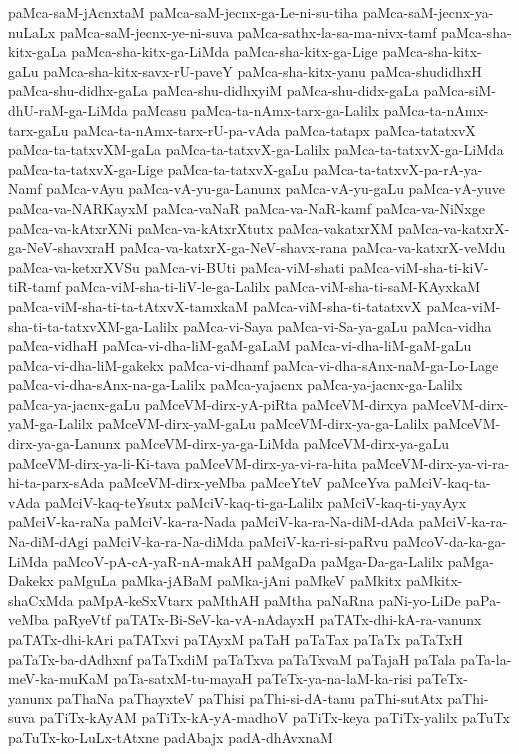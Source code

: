 {paMca-saM-jAcnxtaM
paMca-saM-jecnx-ga-Le-ni-su-tiha
paMca-saM-jecnx-ya-nuLaLx
paMca-saM-jecnx-ye-ni-suva
paMca-sathx-la-sa-ma-nivx-tamf
paMca-sha-kitx-gaLa
paMca-sha-kitx-ga-LiMda
paMca-sha-kitx-ga-Lige
paMca-sha-kitx-gaLu
paMca-sha-kitx-savx-rU-paveY
paMca-sha-kitx-yanu
paMca-shudidhxH
paMca-shu-didhx-gaLa
paMca-shu-didhxyiM
paMca-shu-didx-gaLa
paMca-siM-dhU-raM-ga-LiMda
paMcasu
paMca-ta-nAmx-tarx-ga-Lalilx
paMca-ta-nAmx-tarx-gaLu
paMca-ta-nAmx-tarx-rU-pa-vAda
paMca-tatapx
paMca-tatatxvX
paMca-ta-tatxvXM-gaLa
paMca-ta-tatxvX-ga-Lalilx
paMca-ta-tatxvX-ga-LiMda
paMca-ta-tatxvX-ga-Lige
paMca-ta-tatxvX-gaLu
paMca-ta-tatxvX-pa-rA-ya-Namf
paMca-vAyu
paMca-vA-yu-ga-Lanunx
paMca-vA-yu-gaLu
paMca-vA-yuve
paMca-va-NARKayxM
paMca-vaNaR
paMca-va-NaR-kamf
paMca-va-NiNxge
paMca-va-kAtxrXNi
paMca-va-kAtxrXtutx
paMca-vakatxrXM
paMca-va-katxrX-ga-NeV-shavxraH
paMca-va-katxrX-ga-NeV-shavx-rana
paMca-va-katxrX-veMdu
paMca-va-ketxrXVSu
paMca-vi-BUti
paMca-viM-shati
paMca-viM-sha-ti-kiV-tiR-tamf
paMca-viM-sha-ti-liV-le-ga-Lalilx
paMca-viM-sha-ti-saM-KAyxkaM
paMca-viM-sha-ti-ta-tAtxvX-tamxkaM
paMca-viM-sha-ti-tatatxvX
paMca-viM-sha-ti-ta-tatxvXM-ga-Lalilx
paMca-vi-Saya
paMca-vi-Sa-ya-gaLu
paMca-vidha
paMca-vidhaH
paMca-vi-dha-liM-gaM-gaLaM
paMca-vi-dha-liM-gaM-gaLu
paMca-vi-dha-liM-gakekx
paMca-vi-dhamf
paMca-vi-dha-sAnx-naM-ga-Lo-Lage
paMca-vi-dha-sAnx-na-ga-Lalilx
paMca-yajacnx
paMca-ya-jacnx-ga-Lalilx
paMca-ya-jacnx-gaLu
paMceVM-dirx-yA-piRta
paMceVM-dirxya
paMceVM-dirx-yaM-ga-Lalilx
paMceVM-dirx-yaM-gaLu
paMceVM-dirx-ya-ga-Lalilx
paMceVM-dirx-ya-ga-Lanunx
paMceVM-dirx-ya-ga-LiMda
paMceVM-dirx-ya-gaLu
paMceVM-dirx-ya-li-Ki-tava
paMceVM-dirx-ya-vi-ra-hita
paMceVM-dirx-ya-vi-ra-hi-ta-parx-sAda
paMceVM-dirx-yeMba
paMceYteV
paMceYva
paMciV-kaq-ta-vAda
paMciV-kaq-teYsutx
paMciV-kaq-ti-ga-Lalilx
paMciV-kaq-ti-yayAyx
paMciV-ka-raNa
paMciV-ka-ra-Nada
paMciV-ka-ra-Na-diM-dAda
paMciV-ka-ra-Na-diM-dAgi
paMciV-ka-ra-Na-diMda
paMciV-ka-ri-si-paRvu
paMcoV-da-ka-ga-LiMda
paMcoV-pA-cA-yaR-nA-makAH
paMgaDa
paMga-Da-ga-Lalilx
paMga-Dakekx
paMguLa
paMka-jABaM
paMka-jAni
paMkeV
paMkitx
paMkitx-shaCxMda
paMpA-keSxVtarx
paMthAH
paMtha
paNaRna
paNi-yo-LiDe
paPa-veMba
paRyeVtf
paTATx-Bi-SeV-ka-vA-nAdayxH
paTATx-dhi-kA-ra-vanunx
paTATx-dhi-kAri
paTATxvi
paTAyxM
paTaH
paTaTax
paTaTx
paTaTxH
paTaTx-ba-dAdhxnf
paTaTxdiM
paTaTxva
paTaTxvaM
paTajaH
paTala
paTa-la-meV-ka-muKaM
paTa-satxM-tu-mayaH
paTeTx-ya-na-laM-ka-risi
paTeTx-yanunx
paThaNa
paThayxteV
paThisi
paThi-si-dA-tanu
paThi-sutAtx
paThi-suva
paTiTx-kAyAM
paTiTx-kA-yA-madhoV
paTiTx-keya
paTiTx-yalilx
paTuTx
paTuTx-ko-LuLx-tAtxne
padAbajx
padA-dhAvxnaM
}
